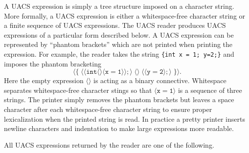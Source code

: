 \documentclass{article}
\begin{document}
A UACS expression is simply a tree structure imposed on a character string.  More formally, a UACS expression is either a whitespace-free character string
or a finite sequence of UACS expressions.  The UACS reader produces UACS expressions of a particular form described below.
A UACS expression can be represented by ``phantom brackets''
which are not printed when printing the expression. For example, the reader takes the string {\tt \{int x = 1; y=2;\}} and imposes the phantom bracketing
$$ \langle\{\;\langle \langle \mathtt{int} \langle \rangle \langle \mathtt{x = 1}\rangle\rangle;\rangle\;\langle\rangle\; \langle\langle \mathtt{y = 2} \rangle ;\rangle\;\}\rangle.$$
Here the empty expression $\langle\rangle$ is acting as a binary connective. Whitespace separates whitespace-free character stings so that $\langle\mathtt{x = 1}\rangle$ is a sequence of three
strings.  The printer simply
removes the phantom brackets but leaves a space character after each whitespace-free character string to ensure proper lexicalization when the printed string is read.
In practice a pretty printer inserts newline
characters and indentation to make large expressions more readable.


All UACS expressions returned by the reader are one of the following.
\end{document}
